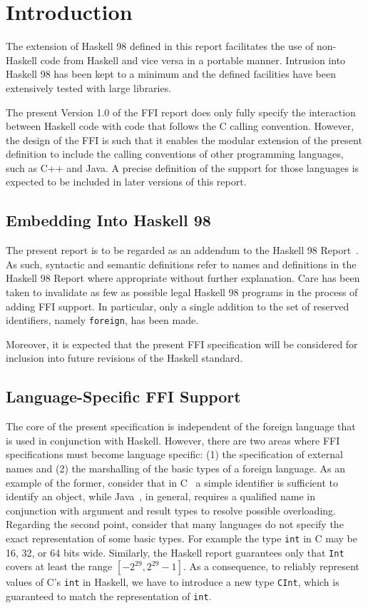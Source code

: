 \documentclass[a4paper,twoside]{article}
\newcommand{\code}[1]{\texttt{#1}}      %
\newcommand{\clearemptydoublepage}{%
  \newpage{\pagestyle{empty}\cleardoublepage}}
\begin{document}
\clearemptydoublepage
{}
\section{Introduction}

The extension of Haskell 98 defined in this report facilitates the use of
non-Haskell code from Haskell and vice versa in a portable manner.  Intrusion
into Haskell 98 has been kept to a minimum and the defined facilities have
been extensively tested with large libraries.

The present Version 1.0 of the FFI report does only fully specify the
interaction between Haskell code with code that follows the C calling
convention.  However, the design of the FFI is such that it enables the
modular extension of the present definition to include the calling conventions
of other programming languages, such as C++ and Java.  A precise definition of
the support for those languages is expected to be included in later versions
of this report.

\subsection{Embedding Into Haskell 98}

The present report is to be regarded as an addendum to the Haskell 98
Report~\cite{haskell98}.  As such, syntactic and semantic definitions refer to
names and definitions in the Haskell 98 Report where appropriate without
further explanation.  Care has been taken to invalidate as few as possible
legal Haskell 98 programs in the process of adding FFI support.  In
particular, only a single addition to the set of reserved identifiers, namely
\code{foreign}, has been made.

Moreover, it is expected that the present FFI specification will be considered
for inclusion into future revisions of the Haskell standard.

\subsection{Language-Specific FFI Support}

The core of the present specification is independent of the foreign language
that is used in conjunction with Haskell.  However, there are two areas where
FFI specifications must become language specific: (1) the specification of
external names and (2) the marshalling of the basic types of a foreign
language.  As an example of the former, consider that in C~\cite{C} a simple
identifier is sufficient to identify an object, while
Java~\cite{gosling-etal:Java}, in general, requires a qualified name in
conjunction with argument and result types to resolve possible overloading.
Regarding the second point, consider that many languages do not specify the
exact representation of some basic types.  For example the type \code{int} in
C may be 16, 32, or 64 bits wide.  Similarly, the Haskell report guarantees
only that \code{Int} covers at least the range \([-2^{29}, 2^{29} - 1]\).  As
a consequence, to reliably represent values of C's \code{int} in Haskell, we
have to introduce a new type \code{CInt}, which is guaranteed to match the
representation of \code{int}.
\end{document}
